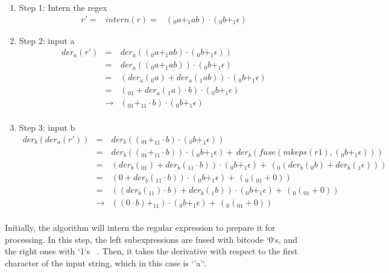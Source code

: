 \documentclass[12pt]{article}
\begin{document}
\begin{enumerate}
  \item Step 1: Intern the regex
  \[
    \begin{array}{rcl}
    r'=       & intern(r)=  &(_0a + _1ab) \cdot (_0b + _1\epsilon)
    \end{array}
    \]
  \item Step 2: input a 
    \[
    \begin{array}{rcl}
    der_a (r') & =           & der_a ( (_0a + _1ab) \cdot (_0b + _1\epsilon) )\\
               & =           & der_a ((_0a + _1ab)) \cdot (_0b + _1\epsilon)\\
               & =           & (der_a (_0a) + der_a (_1ab)) \cdot (_0b + _1\epsilon)\\
               & =           & (_01 + der_a (_1a) \cdot b ) \cdot (_0b + _1\epsilon)\\
               & \rightarrow& (_01 + _11\cdot b) \cdot (_0b + _1\epsilon)\\
    \end{array}
    \]
  \item Step 3: input b
  \[
    \begin{array}{rcl}
    der_b (der_a(r')) & =           & der_b ((_01 + _11\cdot b) \cdot (_0b + _1\epsilon))\\
                      & =           & der_b ((_01 + _11\cdot b)) \cdot (_0b + _1\epsilon) +\, der_b (fuse(mkeps(r1),(_0b + _1\epsilon))) \\
                      & =           & (der_b (_01) + der_b(_11\cdot b)) \cdot (_0b + _1\epsilon) +\,  (_0(der_b(_0b) + der_b(_1\epsilon))) \\
                      & =           & ( 0 + der_b(_11\cdot b)) \cdot (_0b + _1\epsilon) +\,  (_0(_01 + 0)) \\
                      & =           & ((der_b(_11) \cdot b) + der_b(_1b))  \cdot (_0b + _1\epsilon) +\,  (_0(_01 + 0)) \\
                      & \rightarrow & (( 0 \cdot b) + _11)  \cdot (_0b + _1\epsilon) +\,  (_0(_01 + 0)) \\
    \end{array}
  \]

\end{enumerate}
Initially, the algorithm will intern the regular expression to prepare it for processing. In this step, the left subexpressions
are fused with bitcode `0`s, and the right ones with `1`s ~\cite{Sulzmann2014}. Then, it takes the derivative with respect to 
the first character of the input string, which in this case is `'a'`.
\end{document}
